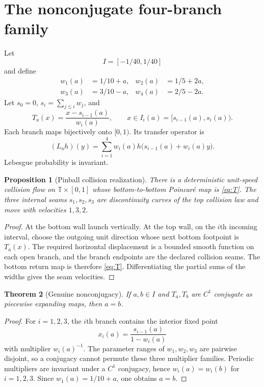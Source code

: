 \documentclass[11pt,reqno]{amsart}
\newtheorem{theorem}{Theorem}[section]
\newtheorem{proposition}[theorem]{Proposition}
\theoremstyle{definition}
\theoremstyle{remark}
\newcommand{\T}{\mathbb T}
\begin{document}
\section{The nonconjugate four-branch family}\label{sec:family}

Let
\[
 I=[-1/40,1/40]
\]
and define
\begin{align*}
 w_1(a)&=1/10+a,&w_2(a)&=1/5+2a,\\
 w_3(a)&=3/10-a,&w_4(a)&=2/5-2a.
\end{align*}
Let $s_0=0$, $s_i=\sum_{j\le i}w_j$, and
\begin{equation}\label{eq:T}
 T_a(x)=\frac{x-s_{i-1}(a)}{w_i(a)},
 \qquad x\in I_i(a)=[s_{i-1}(a),s_i(a)).
\end{equation}
Each branch maps bijectively onto $[0,1)$.  Its transfer operator is
\begin{equation}\label{eq:L}
 (L_ah)(y)=\sum_{i=1}^4w_i(a)
 h\bigl(s_{i-1}(a)+w_i(a)y\bigr).
\end{equation}
Lebesgue probability is invariant.

\begin{proposition}[Pinball collision realization]\label{prop:pinball}
There is a deterministic unit-speed collision flow on
$\T\times[0,1]$ whose bottom-to-bottom Poincar\'e map is \eqref{eq:T}.  The
three internal seams $s_1,s_2,s_3$ are discontinuity curves of the top
collision law and move with velocities $1,3,2$.
\end{proposition}

\begin{proof}
At the bottom wall launch vertically.  At the top wall, on the $i$th incoming
interval, choose the outgoing unit direction whose next bottom footpoint is
$T_a(x)$.  The required horizontal displacement is a bounded smooth function
on each open branch, and the branch endpoints are the declared collision
seams.  The bottom return map is therefore \eqref{eq:T}.  Differentiating the
partial sums of the widths gives the seam velocities.
\end{proof}

\begin{theorem}[Genuine nonconjugacy]\label{thm:nonconjugacy}
If $a,b\in I$ and $T_a,T_b$ are $C^1$ conjugate as piecewise expanding maps,
then $a=b$.
\end{theorem}

\begin{proof}
For $i=1,2,3$, the $i$th branch contains the interior fixed point
\[
 x_i(a)=\frac{s_{i-1}(a)}{1-w_i(a)}
\]
with multiplier $w_i(a)^{-1}$.  The parameter ranges of $w_1,w_2,w_3$ are
pairwise disjoint, so a conjugacy cannot permute these three multiplier
families.  Periodic multipliers are invariant under a $C^1$ conjugacy, hence
$w_i(a)=w_i(b)$ for $i=1,2,3$.  Since $w_1(a)=1/10+a$, one obtains $a=b$.
\end{proof}
\end{document}
